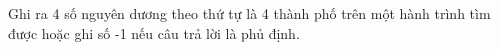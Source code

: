 Ghi ra 4 số nguyên dương theo thứ tự là 4 thành phố trên một hành trình tìm được hoặc ghi số -1 nếu câu trả lời là phủ định.